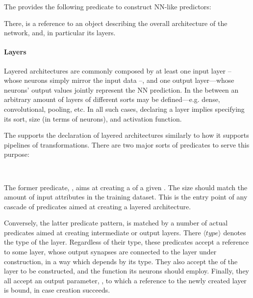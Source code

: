 \documentclass[12pt,a4paper,openright,twoside]{book}
\begin{document}
The \mllib{} provides the following predicate to construct NN-like predictors:
%
\begin{center}
\end{center}
%
There,  is a reference to an object describing the overall architecture of the network, and, in particular its layers.

\paragraph{Layers}

Layered architectures are commonly composed by at least one input layer -- whose neurons simply mirror the input data --, and one output layer---whose neurons' output values jointly represent the NN prediction.
%
In the between an arbitrary amount of layers of different sorts may be defined---e.g. dense, convolutional, pooling, etc.
%
In all such cases, declaring a layer implies specifying its sort, size (in terms of neurons), and activation function.

The \mllib{} supports the declaration of layered architectures similarly to how it supports pipelines of transformations.
%
There are two major sorts of predicates to serve this purpose:
%
\begin{center}
    \\
\end{center}

The former predicate, , aims at creating a  of a given .
%
The size should match the amount of input attributes in the training dataset.
%
This is the entry point of any cascade of predicates aimed at creating a layered architecture.

Conversely, the latter predicate pattern,  is matched by a number of actual predicates aimed at creating intermediate or output layers.
%
There $\langle type \rangle$ denotes the type of the layer.
%
Regardless of their type, these predicates accept a reference to some  layer, whose output synapses are connected to the layer under construction, in a way which depends by its type.
%
They also accept the  of the layer to be constructed, and the  function its neurons should employ.
%
Finally, they all accept an output parameter, , to which a reference to the newly created layer is bound, in case creation succeeds.
\end{document}
